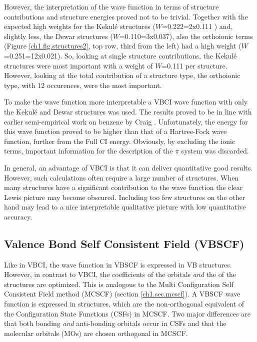 However, the interpretation of the wave function in terms of structure contributions and structure energies proved not  to be trivial. Together with the expected high weights for the Kekul\'{e} structures ($W$=0.222=2x0.111 \cite{vbci175_2}) and, slightly less, the Dewar structures ($W$=0.110=3x0.037), also the orthoionic terms (Figure \ref{ch1.fig.structures2}, top row, third from the left) had a high weight ($W$=0.251=12x0.021). So, looking at single structure contributions, the Kekul\'e structures were most important with a weight of $W$=0.111 per structure. However, looking at the total contribution of a structure type, the orthoionic type, with 12 occurences, were the most important.

To make the wave function more interpretable a VBCI wave function with only the Kekul\'{e} and Dewar structures was used. The results proved to be in line with earlier semi-empirical work on benzene by Craig \cite{craig}. Unfortunately, the energy for this wave function proved to be higher than that of a Hartree-Fock wave function, further from the Full CI energy. Obviously, by excluding the ionic terms, important information for the description of the $\pi$ system was discarded.

In general, an advantage of VBCI is that it can deliver quantitative good results. However, such calculations often require a large number of structures. When many structures have a significant contribution to the wave function the clear Lewis picture may become obscured. Including too few structures on the other hand may lead to a nice interpretable qualitative picture with low quantitative accuracy. 

\subsection{\label{ch1.sec.vbscf}Valence Bond Self Consistent Field (VBSCF)}

Like in VBCI, the wave function in VBSCF is expressed in VB structures. However, in contrast to VBCI, the coefficients of the orbitals \textit{and} the of the structures are optimized. This is analogous to the Multi Configuration Self Consistent Field method (MCSCF) (section \ref{ch1.sec.mcscf}). A VBSCF wave function is  expressed in structures, which are the non-orthogonal equivalent of the Configuration State Functions (CSFs) in MCSCF.  Two major differences are that both bonding \textit{and} anti-bonding orbitals occur in CSFs and that the molecular orbitals (MOs) are chosen orthogonal in MCSCF.

